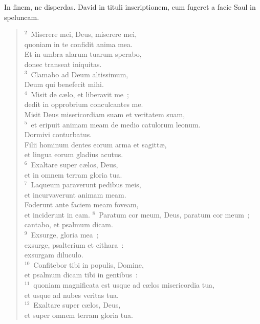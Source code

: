 \bchapter
\lettrine[lines=3,image=true,loversize=0.05,lraise=-0.03]{I}{}n finem, ne disperdas. David in tituli inscriptionem, cum fugeret a facie Saul in speluncam.
\begin{flushleft}\begin{verse}\vspace{6pt}${}^{2}$~Miserere mei, Deus, miserere mei,\\ quoniam in te confidit anima mea.\\ Et in umbra alarum tuarum sperabo,\\ donec transeat iniquitas.\\
${}^{3}$~Clamabo ad Deum altissimum,\\ Deum qui benefecit mihi.\\
${}^{4}$~Misit de c\ae lo, et liberavit me~;\\ dedit in opprobrium conculcantes me.\\ Misit Deus misericordiam suam et veritatem suam,\\
${}^{5}$~et eripuit animam meam de medio catulorum leonum.\\ Dormivi conturbatus.\\ Filii hominum dentes eorum arma et sagitt\ae ,\\ et lingua eorum gladius acutus.\\
${}^{6}$~Exaltare super c\ae los, Deus,\\ et in omnem terram gloria tua.\\
${}^{7}$~Laqueum paraverunt pedibus meis,\\ et incurvaverunt animam meam.\\ Foderunt ante faciem meam foveam,\\ et inciderunt in eam.
${}^{8}$~Paratum cor meum, Deus, paratum cor meum~;\\ cantabo, et psalmum dicam.\\
${}^{9}$~Exsurge, gloria mea~;\\ exsurge, psalterium et cithara~:\\ exsurgam diluculo.\\
${}^{10}$~Confitebor tibi in populis, Domine,\\ et psalmum dicam tibi in gentibus~:\\
${}^{11}$~quoniam magnificata est usque ad c\ae los misericordia tua,\\ et usque ad nubes veritas tua.\\
${}^{12}$~Exaltare super c\ae los, Deus,\\ et super omnem terram gloria tua.\end{verse}\end{flushleft}



